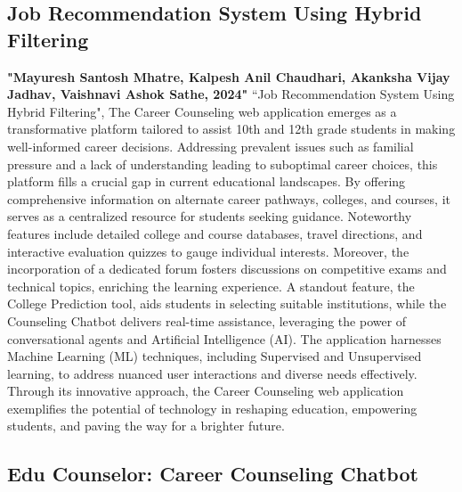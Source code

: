 \subsection{Job Recommendation System Using Hybrid Filtering}

\textbf{"Mayuresh Santosh Mhatre, Kalpesh Anil Chaudhari, Akanksha Vijay Jadhav, Vaishnavi Ashok Sathe, 2024"} “Job Recommendation System Using Hybrid Filtering", The Career Counseling web application emerges as a transformative platform tailored to assist 10th and 12th grade students in making well-informed career decisions. Addressing prevalent issues such as familial pressure and a lack of understanding leading to suboptimal career choices, this platform fills a crucial gap in current educational landscapes. By offering comprehensive information on alternate career pathways, colleges, and courses, it serves as a centralized resource for students seeking guidance. Noteworthy features include detailed college and course databases, travel directions, and interactive evaluation quizzes to gauge individual interests. Moreover, the incorporation of a dedicated forum fosters discussions on competitive exams and technical topics, enriching the learning experience. A standout feature, the College Prediction tool, aids students in selecting suitable institutions, while the Counseling Chatbot delivers real-time assistance, leveraging the power of conversational agents and Artificial Intelligence (AI). The application harnesses Machine Learning (ML) techniques, including Supervised and Unsupervised learning, to address nuanced user interactions and diverse needs effectively. Through its innovative approach, the Career Counseling web application exemplifies the potential of technology in reshaping education, empowering students, and paving the way for a brighter future.

\subsection{Edu Counselor: Career Counseling Chatbot}

